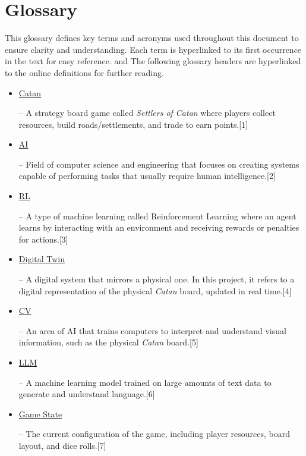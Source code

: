 \documentclass{article}
\newcommand{\CatanExt}{\href{https://en.wikipedia.org/wiki/Catan}{Catan}}
\newcommand{\AIExt}{\href{https://en.wikipedia.org/wiki/Artificial_intelligence}{AI}}
\newcommand{\RLExt}{\href{https://www.ibm.com/think/topics/reinforcement-learning}{RL}}
\newcommand{\DigitalTwinExt}{\href{https://en.wikipedia.org/wiki/Digital_twin}{Digital Twin}}
\newcommand{\CVExt}{\href{https://www.ibm.com/think/topics/computer-vision}{CV}}
\newcommand{\LLMExt}{\href{https://www.cloudflare.com/learning/ai/what-is-large-language-model/}{LLM}}
\newcommand{\GameStateExt}{\href{https://milvus.io/ai-quick-reference/what-is-a-state-in-rl}{Game State}}
\begin{document}
\newpage

\medskip

\hypertarget{glossary-catan}{}
\hypertarget{glossary-ai}{}
\hypertarget{glossary-rl}{}
\hypertarget{glossary-dt}{}
\hypertarget{glossary-cv}{}
\hypertarget{glossary-llm}{}
\hypertarget{glossary-gamestate}{}

\newcommand{\Catan}{\hyperlink{glossary-catan}{Catan}}
\newcommand{\AI}{\hyperlink{glossary-ai}{AI}}
\newcommand{\RL}{\hyperlink{glossary-rl}{RL}}
\newcommand{\DigitalTwin}{\hyperlink{glossary-dt}{Digital Twin}}
\newcommand{\CV}{\hyperlink{glossary-cv}{CV}}
\newcommand{\LLM}{\hyperlink{glossary-llm}{LLM}}
\newcommand{\GameState}{\hyperlink{glossary-gamestate}{Game State}}

\section*{Glossary}
\raggedright This glossary defines key terms and acronyms used throughout this document to ensure clarity and understanding. Each term is hyperlinked to its first occurrence in the text for easy reference. 
and The following glossary headers are hyperlinked to the online definitions for further reading.
\begin{itemize}
    \item \hypertarget{glossary-catan}{\CatanExt{}} – A strategy board game called \textit{Settlers of Catan} where players collect resources, build roads/settlements, and trade to earn points.[1]
    \item \hypertarget{glossary-ai}{\AIExt{}} – Field of computer science and engineering that focuses on creating systems capable of performing tasks that usually require human intelligence.[2]
    \item \hypertarget{glossary-rl}{\RLExt{}} – A type of machine learning called Reinforcement Learning where an agent learns by interacting with an environment and receiving rewards or penalties for actions.[3]
    \item \hypertarget{glossary-dt}{\DigitalTwinExt{}} – A digital system that mirrors a physical one. In this project, it refers to a digital representation of the physical \emph{Catan} board, updated in real time.[4]
    \item \hypertarget{glossary-cv}{\CVExt{}} – An area of AI that trains computers to interpret and understand visual information, such as the physical \emph{Catan} board.[5]
    \item \hypertarget{glossary-llm}{\LLMExt{}} – A machine learning model trained on large amounts of text data to generate and understand language.[6]
    \item \hypertarget{glossary-gamestate}{\GameStateExt{}} – The current configuration of the game, including player resources, board layout, and dice rolls.[7]
\end{itemize}
\end{document}
